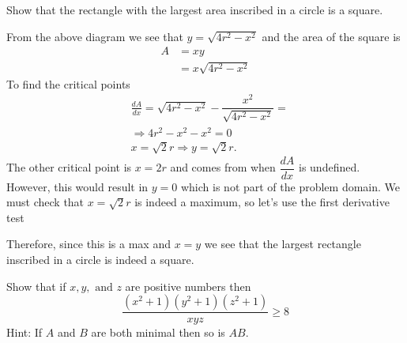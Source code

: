 \documentclass{hwset}
\begin{document}
\begin{problem}[2.]
  Show that the rectangle with the largest area inscribed in a circle is a
  square.
\end{problem}

\begin{solution}
    \begin{center}
    \end{center}
    From the above diagram we see that $y = \sqrt{4r^2-x^2}$ and the area of the
    square is
    \begin{align*}
      A &= xy \\
      &= x\sqrt{4r^2 - x^2}
    \end{align*}
    To find the critical points
    \begin{align*}
      &\frac{dA}{dx} = \sqrt{4r^2-x^2} - \dfrac{x^2}{\sqrt{4r^2-x^2}} = \\
      & \Rightarrow 4r^2 - x^2 - x^2 = 0 \\
      & x = \sqrt{2} r \Rightarrow y = \sqrt{2} r.
    \end{align*}
    The other critical point is $x = 2r$ and comes from when
    $\dfrac{dA}{dx}$ is undefined. However, this would result in $y=0$ which is
    not part of the problem domain. We must check that $x=\sqrt{2} r$ is indeed
    a maximum, so let's use the first derivative test
    \begin{center}
    \end{center}
    Therefore, since this is a max and $x=y$ we see that the largest rectangle
    inscribed in a circle is indeed a square.
\end{solution}

\begin{problem}[3.]
  Show that if $x,y,\text{ and } z$ are positive numbers then
  \begin{equation*}
    \dfrac{\left( x^2 + 1 \right)\left( y^2 + 1 \right)\left( z^2 + 1
    \right)}{xyz} \ge 8
  \end{equation*}
  Hint: If $A$ and $B$ are both minimal then so is $AB$.
\end{problem}
\end{document}
